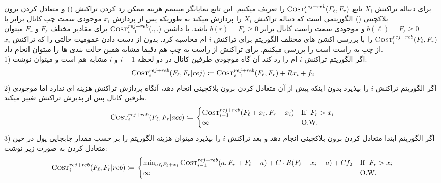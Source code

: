  
برای دنباله تراکنش
$X_i$
تابع 
$\textsc{Cost}_i^{rej+reb}(F_{\ell},F_{r})$
را تعریف میکنیم. این تابع نمایانگر مینیمم هزینه ممکن رد کردن تراکنش () و متعادل کردن برون بلاکچینی  () الگوریتمی است که دنباله تراکنش
$X_i$
را پردازش میکند به طوریکه پس از پردازش
$x_i$
موجودی سمت چپ کانال برابر با
$b(\ell)=F_{\ell} \geq 0$
و موجودی سمت راست کانال برابر
$b(r)=F_{r} \geq 0$
باشد.
با داشتن 
$\textsc{Cost}_{i-1}^{rej+reb}(.,.)$
برای مقادیر مختلف
$F_{\ell}$
و
$F_{r}$
میتوان 
$\textsc{Cost}_{i}^{rej+reb}(F_{\ell},F_{r})$
را با بررسی اکشن های مختلف الگوریتم برای تراکنش 
$i$
ام محاسبه کرد. بدون از دست دادن عمومیت حالتی را که تراکنش
$x_i$
از چپ به راست است را بررسی میکنیم. برای تراکنش از راست به چپ هم دقیقا مشابه همین حالت بندی ها را میتوان انجام داد.\\
1) اگر الگوریتم تراکنش $i$ ام را رد کند آن گاه موجودی طرفین کانال در دو لحظه
$i-1$
و 
$i$
مشابه هم است و میتوان نوشت:
\begin{equation}
\textsc{Cost}_{i}^{rej+reb}(F_{\ell},F_{r}|rej) \coloneq \textsc{Cost}_{i-1}^{rej+reb}(F_{\ell},F_{r}) + Rx_i+f_2
\end{equation}
2) اگر الگوریتم تراکنش 
$i$
را بپذیرد بدون اینکه پیش از آن متعادل کردن برون بلاکچینی انجام دهد، آنگاه پردازش تراکنش هزینه ای ندارد اما موجودی طرفین کانال پس از پذیرش تراکنش تغییر میکند.
\begin{equation}
\textsc{Cost}_{i}^{rej+reb}(F_{\ell},F_{r}|acc) \coloneq \\
    \begin{cases}
       \textsc{Cost}_{i-1}^{rej+reb}(F_{\ell}+x_i,F_{r}-x_i) & \text{If } \; F_{r} > x_i  \\
        \infty & \text{O.W. }
    \end{cases}       
\end{equation}
3) اگر الگوریتم ابتدا متعادل کردن برون بلاکچینی انجام دهد و بعد تراکنش
$i$
را بپذیرد میتوان هزینه الگوریتم را بر حسب مقدار جابجایی پول در حین متعادل کردن به صورت زیر نوشت:
\begin{equation}
\textsc{Cost}_{i}^{rej+reb}(F_{\ell},F_{r}|reb)  \coloneq \\
    \begin{cases}
       \min_{a \le F_{\ell} + x_i}  \textsc{Cost}_{i-1}^{rej+reb}(a, F_r+ F_{\ell} - a) + C\cdot R(F_{\ell} + x_i - a)+Cf_2 & \text{If } \; F_{r} > x_i  \\
        \infty & \text{O.W. }
    \end{cases}       
\end{equation}
